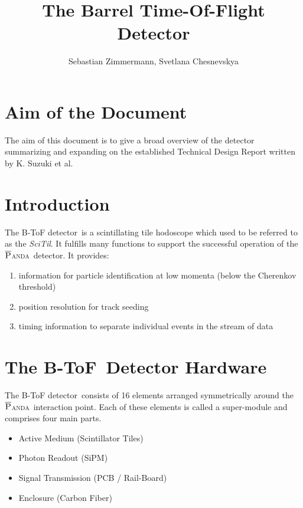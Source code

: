 \documentclass[12pt,a4paper,oneside]{article}
\author{Sebastian Zimmermann, Svetlana Chesnevskya}
\title{The Barrel Time-Of-Flight Detector}
\newcommand{\panda}{\textsc{$\overline{\textsc{P}}$anda}}
\newcommand{\btof}{B-ToF}
\newcommand{\btofD}{B-ToF detector}
\newcommand{\railboard}{Rail-Board}
\newcommand{\sipm}{SiPM}
\begin{document}
\maketitle

\section*{Aim of the Document}
The aim of this document is to give a broad overview of the detector summarizing and expanding on the established Technical Design Report written by K. Suzuki et al.

\tableofcontents
\newpage

\section{Introduction}

The \btofD\ is a scintillating tile hodoscope which used to be referred to as the \emph{SciTil}. It fulfills many functions to support the successful operation of the \panda\ detector. It provides:
\begin{enumerate}[I]
	\item	information for particle identification at low momenta (below the Cherenkov threshold)
	\item	position resolution for track seeding
	\item	timing information to separate individual events in the stream of data
\end{enumerate}


\section{The \btof\ Detector Hardware}

The \btofD\ consists of 16 elements arranged symmetrically around the \panda\ interaction point. Each of these elements is called a super-module and comprises four main parts.

\begin{itemize}
	\item Active Medium (Scintillator Tiles)
	\item Photon Readout (\sipm)
	\item Signal Transmission (PCB / \railboard )
	\item Enclosure (Carbon Fiber)
\end{itemize}
\end{document}

